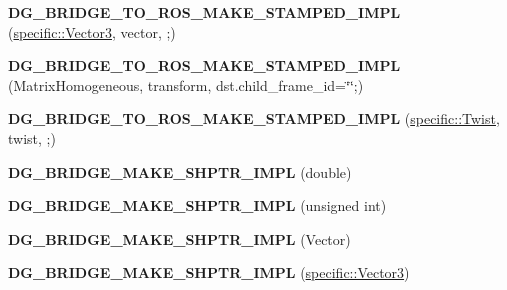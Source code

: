 \begin{DoxyCompactItemize}
\item 
\mbox{\label{namespacedynamic__graph_a9f06698a083bc347b17f16107c5289e9}} 
{\bfseries D\+G\+\_\+\+B\+R\+I\+D\+G\+E\+\_\+\+T\+O\+\_\+\+R\+O\+S\+\_\+\+M\+A\+K\+E\+\_\+\+S\+T\+A\+M\+P\+E\+D\+\_\+\+I\+M\+PL} (\hyperlink{classdynamic__graph_1_1specific_1_1Vector3}{specific\+::\+Vector3}, vector, ;)
\item 
\mbox{\label{namespacedynamic__graph_a612d5b355619bf2e6aaa3be10d400882}} 
{\bfseries D\+G\+\_\+\+B\+R\+I\+D\+G\+E\+\_\+\+T\+O\+\_\+\+R\+O\+S\+\_\+\+M\+A\+K\+E\+\_\+\+S\+T\+A\+M\+P\+E\+D\+\_\+\+I\+M\+PL} (Matrix\+Homogeneous, transform, dst.\+child\+\_\+frame\+\_\+id=\char`\"{}\char`\"{};)
\item 
\mbox{\label{namespacedynamic__graph_a7057c2853072917bd1ff399eccc66bb1}} 
{\bfseries D\+G\+\_\+\+B\+R\+I\+D\+G\+E\+\_\+\+T\+O\+\_\+\+R\+O\+S\+\_\+\+M\+A\+K\+E\+\_\+\+S\+T\+A\+M\+P\+E\+D\+\_\+\+I\+M\+PL} (\hyperlink{classdynamic__graph_1_1specific_1_1Twist}{specific\+::\+Twist}, twist, ;)
\item 
\mbox{\label{namespacedynamic__graph_ae22a330aece4dccbed6a8e24ac897223}} 
{\bfseries D\+G\+\_\+\+B\+R\+I\+D\+G\+E\+\_\+\+M\+A\+K\+E\+\_\+\+S\+H\+P\+T\+R\+\_\+\+I\+M\+PL} (double)
\item 
\mbox{\label{namespacedynamic__graph_a6f98ec6c1978860a339800f794b86c6a}} 
{\bfseries D\+G\+\_\+\+B\+R\+I\+D\+G\+E\+\_\+\+M\+A\+K\+E\+\_\+\+S\+H\+P\+T\+R\+\_\+\+I\+M\+PL} (unsigned int)
\item 
\mbox{\label{namespacedynamic__graph_a75a4142b33cde4c86e2bc4b7b410be5a}} 
{\bfseries D\+G\+\_\+\+B\+R\+I\+D\+G\+E\+\_\+\+M\+A\+K\+E\+\_\+\+S\+H\+P\+T\+R\+\_\+\+I\+M\+PL} (Vector)
\item 
\mbox{\label{namespacedynamic__graph_a325010454ba7c2835ab21badc5fd1938}} 
{\bfseries D\+G\+\_\+\+B\+R\+I\+D\+G\+E\+\_\+\+M\+A\+K\+E\+\_\+\+S\+H\+P\+T\+R\+\_\+\+I\+M\+PL} (\hyperlink{classdynamic__graph_1_1specific_1_1Vector3}{specific\+::\+Vector3})
\item 
\mbox{\label{namespacedynamic__graph_a9f8a93a86c41c53460cbe62b1838a12f}} 

\end{DoxyCompactItemize}

